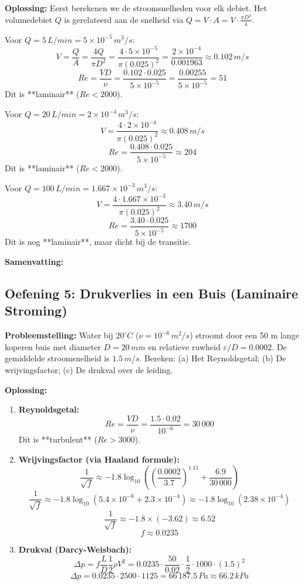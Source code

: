 \documentclass[a4paper,11pt,twoside]{report}
\begin{document}
\textbf{Oplossing:}
Eerst berekenen we de stroomsnelheden voor elk debiet. Het volumedebiet $Q$ is gerelateerd aan de snelheid via $Q = V \cdot A = V \cdot \frac{\pi D^2}{4}$.

Voor $Q = 5 \, L/min = 5 \times 10^{-5} \, m^3/s$:
\[ V = \frac{Q}{A} = \frac{4Q}{\pi D^2} = \frac{4 \cdot 5 \times 10^{-5}}{\pi (0.025)^2} = \frac{2 \times 10^{-4}}{0.001963} \approx 0.102 \, m/s \]
\[ Re = \frac{VD}{\nu} = \frac{0.102 \cdot 0.025}{5 \times 10^{-5}} = \frac{0.00255}{5 \times 10^{-5}} = 51 \]
Dit is **laminair** ($Re < 2000$).

Voor $Q = 20 \, L/min = 2 \times 10^{-4} \, m^3/s$:
\[ V = \frac{4 \cdot 2 \times 10^{-4}}{\pi (0.025)^2} \approx 0.408 \, m/s \]
\[ Re = \frac{0.408 \cdot 0.025}{5 \times 10^{-5}} \approx 204 \]
Dit is **laminair** ($Re < 2000$).

Voor $Q = 100 \, L/min = 1.667 \times 10^{-3} \, m^3/s$:
\[ V = \frac{4 \cdot 1.667 \times 10^{-3}}{\pi (0.025)^2} \approx 3.40 \, m/s \]
\[ Re = \frac{3.40 \cdot 0.025}{5 \times 10^{-5}} \approx 1700 \]
Dit is nog **laminair**, maar dicht bij de transitie.

\textbf{Samenvatting:} 

\subsection{Oefening 5: Drukverlies in een Buis (Laminaire Stroming)}
\textbf{Probleemstelling:}
Water bij $20^\circ C$ ($\nu = 10^{-6} \, m^2/s$) stroomt door een 50 m lange koperen buis met diameter $D = 20 \, mm$ en relatieve ruwheid $\varepsilon/D = 0.0002$. De gemiddelde stroomsnelheid is $1.5 \, m/s$.
Bereken: (a) Het Reynoldsgetal; (b) De wrijvingsfactor; (c) De drukval over de leiding.

\textbf{Oplossing:}
\begin{enumerate}
    \item \textbf{Reynoldsgetal:}
    \[ Re = \frac{VD}{\nu} = \frac{1.5 \cdot 0.02}{10^{-6}} = 30\,000 \]
    Dit is **turbulent** ($Re > 3000$).
    
    \item \textbf{Wrijvingsfactor (via Haaland formule):}
    \[ \frac{1}{\sqrt{f}} \approx -1.8 \log_{10} \left( \left( \frac{0.0002}{3.7} \right)^{1.11} + \frac{6.9}{30\,000} \right) \]
    \[ \frac{1}{\sqrt{f}} \approx -1.8 \log_{10} (5.4 \times 10^{-6} + 2.3 \times 10^{-4}) \approx -1.8 \log_{10} (2.38 \times 10^{-4}) \]
    \[ \frac{1}{\sqrt{f}} \approx -1.8 \times (-3.62) \approx 6.52 \]
    \[ f \approx 0.0235 \]
    
    \item \textbf{Drukval (Darcy-Weisbach):}
    \[ \Delta p = f \frac{L}{D} \frac{1}{2}\rho V^2 = 0.0235 \cdot \frac{50}{0.02} \cdot \frac{1}{2} \cdot 1000 \cdot (1.5)^2 \]
    \[ \Delta p = 0.0235 \cdot 2500 \cdot 1125 = 66\,187.5 \, Pa \approx 66.2 \, kPa \]
\end{enumerate}
\end{document}
